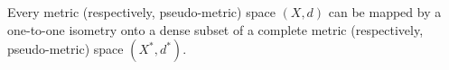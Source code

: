 Every metric (respectively, pseudo-metric) space $(X, d)$ can be mapped by a one-to-one isometry onto a dense subset of a complete metric (respectively, pseudo-metric) space $(X^*, d^*)$.
